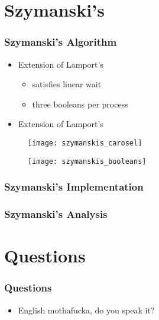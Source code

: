 \documentclass[t, pdftex]{beamer}
\begin{document}
\section{Szymanski's}
\begin{frame}[c]
    \frametitle{Szymanski's Algorithm}
    \begin{itemize}
      \item Extension of Lamport's
        \begin{itemize}
          \item satisfies linear wait
          \item three booleans per process
        \end{itemize}
      \item Extension of Lamport's
    \end{itemize}
  \begin{figure}
    \centering
    \begin{minipage}{.5\textwidth}
      \centering
      \texttt{[image: szymanskis\_carosel]}
      \label{fig:szymanskis_carosel}
    \end{minipage}%
    \begin{minipage}{.5\textwidth}
      \centering
      \texttt{[image: szymanskis\_booleans]}
      \label{fig:szymanskis_booleans}
    \end{minipage}
  \end{figure}
\end{frame}

\begin{frame}
  \frametitle{Szymanski's Implementation}
  \begin{multicols*}{3}
    
  \end{multicols*}
\end{frame}

\begin{frame}
  \frametitle{Szymanski's Analysis}
  
\end{frame}

\section{Questions}
\begin{frame}[c]
    \frametitle{Questions}  %
    \begin{itemize}
        \item English mothafucka, do you speak it?
    \end{itemize}
\end{frame}


\end{document}
